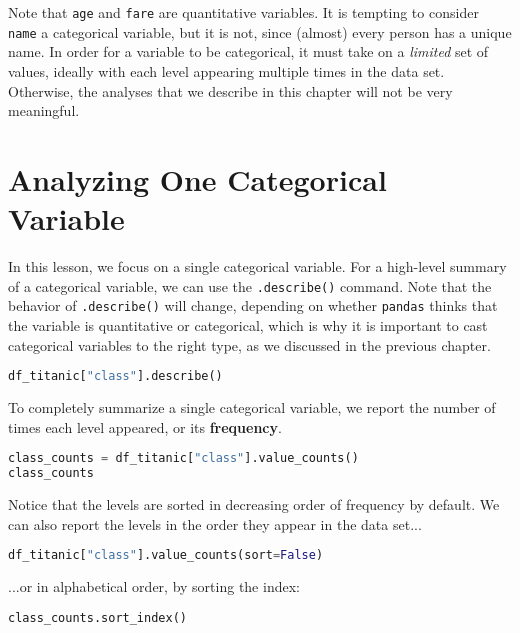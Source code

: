 Note that \verb|age| and \verb|fare| are quantitative variables. It is tempting to consider \verb|name| a categorical variable, but it is not, since (almost) every person has a unique name. In order for a variable to be categorical, it must take on a \textit{limited} set of values, ideally with each level appearing multiple times in the data set. Otherwise, the analyses that we describe in this chapter will not be very meaningful.






\section{Analyzing One Categorical Variable}\label{2.1}

In this lesson, we focus on a single categorical variable. For a high-level summary of a categorical variable, we can use the \verb|.describe()| command. Note that the behavior of \verb|.describe()| will change, depending on whether \verb|pandas| thinks that the variable is quantitative or categorical, which is why it is important to cast categorical variables to the right type, as we discussed in the previous chapter.

\begin{lstlisting}[language=Python]
df_titanic["class"].describe()
\end{lstlisting}




To completely summarize a single categorical variable, we report the number of times each level appeared, or its \textbf{frequency}.

\begin{lstlisting}[language=Python]
class_counts = df_titanic["class"].value_counts()
class_counts
\end{lstlisting}




Notice that the levels are sorted in decreasing order of frequency by default. We can also report the levels in the order they appear in the data set...

\begin{lstlisting}[language=Python]
df_titanic["class"].value_counts(sort=False)
\end{lstlisting}




...or in alphabetical order, by sorting the index:

\begin{lstlisting}[language=Python]
class_counts.sort_index()
\end{lstlisting}




